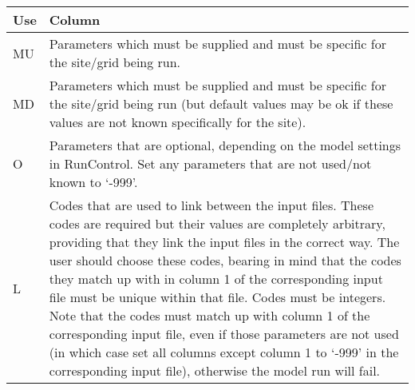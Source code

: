 \documentclass[letterpaper,10pt,english]{sphinxmanual}
\begin{document}
\begin{savenotes}\sphinxattablestart
\centering
\begin{tabulary}{\linewidth}[t]{|T|T|}
\hline
\sphinxstyletheadfamily 
Use
&\sphinxstyletheadfamily 
Column
\\
\hline
MU
&
Parameters which must be supplied
and must be specific for the
site/grid being run.
\\
\hline
MD
&
Parameters which must be supplied
and must be specific for the
site/grid being run (but default
values may be ok if these values
are not known specifically for
the site).
\\
\hline
O
&
Parameters that are optional,
depending on the model settings
in RunControl. Set any parameters
that are not used/not known to
‘-999’.
\\
\hline
L
&
Codes that are used to link
between the input files. These
codes are required but their
values are completely arbitrary,
providing that they link the
input files in the correct way.
The user should choose these
codes, bearing in mind that the
codes they match up with in
column 1 of the corresponding
input file must be unique within
that file. Codes must be
integers. Note that the codes
must match up with column 1 of
the corresponding input file,
even if those parameters are not
used (in which case set all
columns except column 1 to ‘-999’
in the corresponding input file),
otherwise the model run will
fail.
\\
\hline
\end{tabulary}
\par
\sphinxattableend\end{savenotes}
\end{document}
